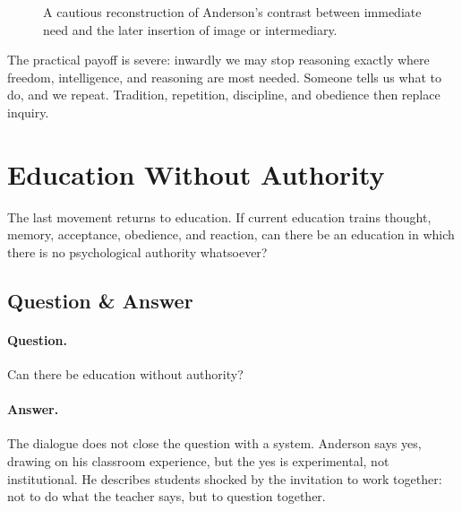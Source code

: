 \begin{figure}
\centering
{}
\caption{A cautious reconstruction of Anderson's contrast between immediate need and the later insertion of image or intermediary.}
\end{figure}

The practical payoff is severe: inwardly we may stop reasoning exactly where freedom, intelligence, and reasoning are most needed. Someone tells us what to do, and we repeat. Tradition, repetition, discipline, and obedience then replace inquiry.

\section{Education Without Authority}

The last movement returns to education. If current education trains thought, memory, acceptance, obedience, and reaction, can there be an education in which there is no psychological authority whatsoever?

\subsection{Question \& Answer}

\paragraph{Question.}
Can there be education without authority?

\paragraph{Answer.}
The dialogue does not close the question with a system. Anderson says yes, drawing on his classroom experience, but the yes is experimental, not institutional. He describes students shocked by the invitation to work together: not to do what the teacher says, but to question together.

